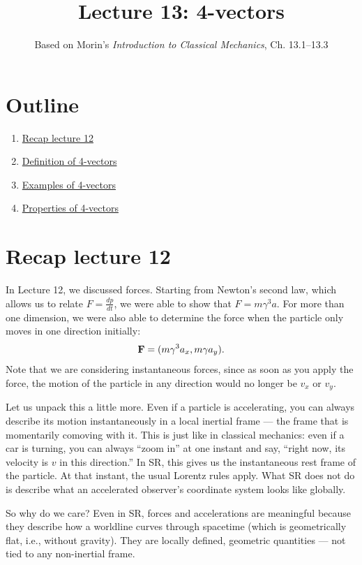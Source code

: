\documentclass[12pt]{article}
\title{\textbf{Lecture 13: 4-vectors}}
\author{Based on Morin's \textit{Introduction to Classical Mechanics}, Ch. 13.1--13.3}
\date{}
\newcommand{\be}{\begin{eqnarray}}
\newcommand{\ee}{\end{eqnarray}}
\begin{document}
\maketitle

\section*{Outline}
\begin{enumerate}
    \item \href{sec:recap}{Recap lecture 12}
    \item \href{sec:definition}{Definition of 4-vectors}
    \item \href{sec:examples}{Examples of 4-vectors}
    \item \href{sec:examples}{Properties of 4-vectors}
\end{enumerate}

\section{Recap lecture 12}\label{sec:recap}
In Lecture 12, we discussed forces. Starting from Newton's second law, which allows us to relate $F = \frac{dp}{dt}$, we were able to show that $F = m \gamma^3 a$. For more than one dimension, we were also able to determine the force when the particle only moves in one direction initially:
\be
{\bf F}=(m\gamma^3 a_x, m\gamma a_y) \label{eq:3force}.
\ee
Note that we are considering instantaneous forces, since as soon as you apply the force, the motion of the particle in any direction would no longer be $v_x$ or $v_y$. 

Let us unpack this a little more. Even if a particle is accelerating, you can always describe its motion instantaneously in a local inertial frame — the frame that is momentarily comoving with it. This is just like in classical mechanics: even if a car is turning, you can always “zoom in” at one instant and say, “right now, its velocity is $v$ in this direction.” In SR, this gives us the instantaneous rest frame of the particle. At that instant, the usual Lorentz rules apply. What SR does not do is describe what an accelerated observer’s coordinate system looks like globally. 

So why do we care? Even in SR, forces and accelerations are meaningful because they describe how a worldline curves through spacetime (which is geometrically flat, i.e., without gravity). They are locally defined, geometric quantities — not tied to any non-inertial frame.
\end{document}
